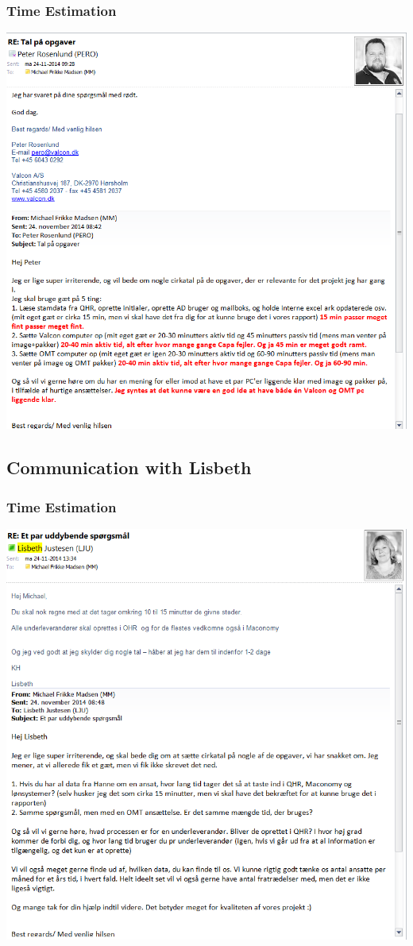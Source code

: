 \subsubsection{Time Estimation}
\includegraphics[width=1.36\textwidth]{appendix/peter_communication_1}

\subsection{Communication with Lisbeth}

\subsubsection{Time Estimation}
\includegraphics[width=1.36\textwidth]{appendix/lisbeth_communication_1}

